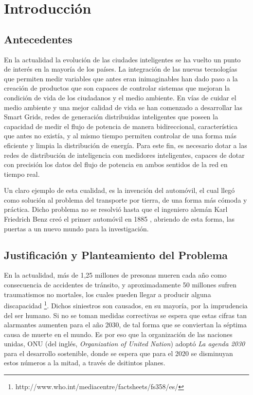 \chapter{Introducción}\label{sec:capitulo1}
\thispagestyle{empty}

\begingroup
{}
\small

\endgroup

\section{Antecedentes}
En la actualidad la evolución de las ciudades inteligentes se ha vuelto un punto
de interés en la mayoría de los países. La integración de las nuevas tecnologías
que permiten medir variables que antes eran inimaginables han dado paso a la
creación de productos que son capaces de controlar sistemas que mejoran la
condición de vida de los ciudadanos y el medio ambiente. En vías de cuidar el
medio ambiente y una mejor calidad de vida se han comenzado a desarrollar
las Smart Grids, redes de generación distribuidas inteligentes que poseen la
capacidad de medir el flujo de potencia de manera bidireccional, característica
que antes no existía, y al mismo tiempo permiten controlar de una forma más
eficiente y limpia la distribución de energía. Para este fin, es necesario dotar
a las redes de distribución de inteligencia con medidores inteligentes, capaces
de dotar con precisión los datos del flujo de potencia en ambos sentidos de la
red en tiempo real.\\

\par Un claro ejemplo de esta cualidad, es la invención del automóvil, el cual
 llegó como solución al problema del transporte por tierra, de una forma más
 cómoda y práctica. Dicho problema no se resolvió hasta que el ingeniero alemán
 Karl Friedrich Benz creó el primer automóvil en 1885 \cite{cernuschi2005cuatro},
 abriendo de esta forma, las puertas a un nuevo mundo para la investigación.\\


\section{Justificación y Planteamiento del Problema}

En la actualidad, más de 1,25 millones de presonas mueren cada año como
consecuencia de accidentes de tránsito, y aproximadamente 50 millones
 sufren traumatismos no mortales, los cuales pueden llegar a producir
 alguna discapacidad \footnote{http://www.who.int/mediacentre/factsheets/fs358/es/}.
  Dichos siniestros son causados, en su mayoría, por la imprudencia del ser
   humano. Si no se toman medidas correctivas se espera que estas cifras tan
   alarmantes aumenten para el año 2030, de tal forma que se conviertan la
   séptima causa de muerte en el mundo. Es por eso que la organización de las
   naciones unidas, ONU (del inglés, \textit{Organization of United Nation})
   adoptó \textit{La agenda 2030} para el desarrollo sostenible, donde se
   espera que para el 2020 se disminuyan estos números a la mitad, a través de
   dsitintos planes.\\

